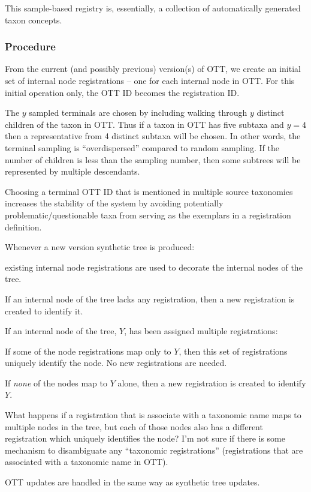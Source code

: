 \documentclass[11pt]{article}
\begin{document}
This sample-based registry is, essentially, a collection of automatically
  generated taxon concepts.

\subsubsection{Procedure}
\begin{compactenum}
  \item From the current (and possibly previous) version(s) of OTT,
  we create an initial set of internal node registrations -- one for each internal node in OTT.
  For this initial operation only, the OTT ID becomes the registration ID.
  \begin{compactitem}
    \item The $y$ sampled terminals are chosen by including walking through $y$ distinct
    children of the taxon in OTT.
    Thus if a taxon in OTT has five subtaxa and $y=4$ then a representative from
    4 distinct subtaxa will be chosen.
    In other words, the terminal sampling is ``overdispersed'' compared to random sampling.
    If the number of children is less than the sampling number, then some subtrees will be represented by multiple descendants.
    \item Choosing a terminal OTT ID that is mentioned in multiple source taxonomies increases
    the stability of the system by avoiding potentially problematic/questionable
    taxa from serving as the exemplars in a registration definition.
  \end{compactitem}
  \item Whenever a new version synthetic tree is produced:
    \begin{compactenum}
      \item existing internal node registrations are used to decorate the
      internal nodes of the tree.
      \item If an internal node of the tree lacks any registration, then a new registration is
      created to identify it.
      \item If an internal node of the tree, $Y$, has been assigned multiple registrations:
      \begin{compactenum}
        \item If some of the node registrations map only to $Y$, then this set
          of registrations uniquely identify the node. No new registrations are
          needed.
        \item If {\em none} of the nodes map to $Y$ alone, then a new
        registration is created to identify $Y$.
      \end{compactenum}
      \item What happens if a registration that is associate with a taxonomic name maps to
      multiple nodes in the tree, but each of those nodes also has a different registration
      which uniquely identifies the node? I'm not sure if there is some mechanism to 
      disambiguate any ``taxonomic registrations'' (registrations that are associated with
      a taxonomic name in OTT).
    \end{compactenum}
  \item OTT updates are handled in the same way as synthetic tree updates.
\end{compactenum}
\end{document}
